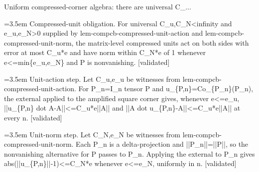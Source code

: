 \documentclass{article}
\newcommand{\step}[1]{\par\noindent\hangindent=3.5em\hangafter=1%
  \makebox[3.5em][l]{\textbf{#1.}}}
\newcommand{\steptag}[1]{\hfill{\small\textsf{[#1]}}}
\begin{document}
\begin{proofbox}{Uniform compressed-corner algebra: there are universal C\_...}
\step{1.5} Compressed-unit obligation. For universal C\_u,C\_N<infinity and e\_u,e\_N>0 supplied by lem-compcb-compressed-unit-action and lem-compcb-compressed-unit-norm, the matrix-level compressed units act on both sides with error at most C\_u*e and have norm within C\_N*e of 1 whenever e<=min\{e\_u,e\_N\} and P is nonvanishing. \steptag{validated} \\[6pt]
\step{1.5.1} Unit-action step. Let C\_u,e\_u be witnesses from lem-compcb-compressed-unit-action. For P\_n=I\_n tensor P and u\_\{P,n\}=Co\_\{P\_n\}(P\_n), the external applied to the amplified square corner gives, whenever e<=e\_u, ||u\_\{P,n\} dot A-A||<=C\_u*e||A|| and ||A dot u\_\{P,n\}-A||<=C\_u*e||A|| at every n. \steptag{validated} \\[4pt]
\step{1.5.2} Unit-norm step. Let C\_N,e\_N be witnesses from lem-compcb-compressed-unit-norm. Each P\_n is a delta-projection and ||P\_n||=||P||, so the nonvanishing alternative for P passes to P\_n. Applying the external to P\_n gives abs(||u\_\{P,n\}||-1)<=C\_N*e whenever e<=e\_N, uniformly in n. \steptag{validated} \\[4pt]
\end{proofbox}
\end{document}
